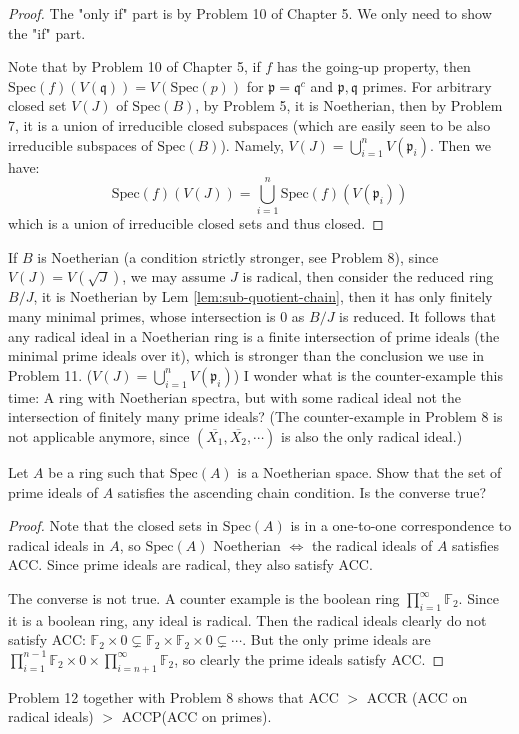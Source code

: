 \documentclass{solution}
\begin{document}
\begin{proof}
    The "only if" part is by Problem 10 of Chapter 5. We only need to show the "if" part.

    Note that by Problem 10 of Chapter 5, if $f$ has the going-up property, then $\mathrm{Spec}(f)(V(\mathfrak{q})) = V(\mathrm{Spec}(p))$ for $\mathfrak{p} = \mathfrak{q}^c$ and $\mathfrak{p}, \mathfrak{q}$ primes. For arbitrary closed set $V(J)$ of $\mathrm{Spec}(B)$, by Problem 5, it is Noetherian, then by Problem 7, it is a union of irreducible closed subspaces (which are easily seen to be also irreducible subspaces of $\mathrm{Spec}(B)$). Namely, $V(J) = \bigcup\limits_{i = 1}^{n} V(\mathfrak{p}_i)$. Then we have:
    $$\mathrm{Spec}(f)(V(J)) = \bigcup\limits_{i = 1}^n \mathrm{Spec}(f)(V(\mathfrak{p}_i))$$
    which is a union of irreducible closed sets and thus closed.
\end{proof}

{\color{red} If $B$ is Noetherian (a condition strictly stronger, see Problem 8), since $V(J) = V(\sqrt{J})$, we may assume $J$ is radical, then consider the reduced ring $B / J$, it is Noetherian by Lem \ref{lem:sub-quotient-chain}, then it has only finitely many minimal primes, whose intersection is $0$ as $B / J$ is reduced. It follows that any radical ideal in a Noetherian ring is a finite intersection of prime ideals (the minimal prime ideals over it), which is stronger than the conclusion we use in Problem 11. ($V(J) = \bigcup\limits_{i = 1}^{n} V(\mathfrak{p}_i)$) \TODO I wonder what is the counter-example this time: A ring with Noetherian spectra, but with some radical ideal not the intersection of finitely many prime ideals? (The counter-example in Problem 8 is not applicable anymore, since $(\overline{X_1}, \overline{X_2}, \cdots)$ is also the only radical ideal.)}

\begin{problem}
    Let $A$ be a ring such that $\mathrm{Spec}(A)$ is a Noetherian space. Show that the set of prime ideals of $A$ satisfies the ascending chain condition. Is the converse true?
\end{problem}

\begin{proof}
    Note that the closed sets in $\mathrm{Spec}(A)$ is in a one-to-one correspondence to radical ideals in $A$, so $\mathrm{Spec}(A)$ Noetherian $\Leftrightarrow$ the radical ideals of $A$ satisfies ACC. Since prime ideals are radical, they also satisfy ACC.

    The converse is not true. A counter example is the boolean ring $\prod\limits_{i = 1}^{\infty} \mathbb{F}_2$. Since it is a boolean ring, any ideal is radical. Then the radical ideals clearly do not satisfy ACC: $\mathbb{F}_2 \times 0 \subsetneq \mathbb{F}_2 \times \mathbb{F}_2 \times 0 \subsetneq \cdots$. But the only prime ideals are $\prod\limits_{i = 1}^{n - 1} \mathbb{F}_2 \times 0 \times \prod\limits_{i = n + 1}^{\infty} \mathbb{F}_2$, so clearly the prime ideals satisfy ACC.
\end{proof}

{\color{red} Problem 12 together with Problem 8 shows that ACC $\gt$ ACCR (ACC on radical ideals) $\gt$ ACCP(ACC on primes).}
\end{document}
